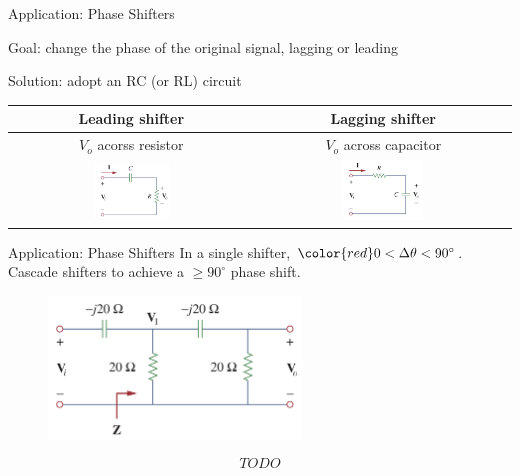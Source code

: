 \documentclass{beamer}
\begin{document}
\begin{frame}{Application: Phase Shifters}

Goal: change the phase of the original signal, lagging or leading

Solution: adopt an RC (or RL) circuit
\begin{table}[]
    \centering
    \begin{tabular}{cc}
        \toprule
        Leading shifter & Lagging shifter \\
        \midrule
        $V_o$ acorss resistor & $V_o$ across capacitor\\
        \includegraphics[width=0.32\textwidth]{img_ch9/3_shifterleadoutput.png}
        &
        \includegraphics[width=0.33\textwidth]{img_ch9/4_shifterlagoutput.png}        
        \\
        \bottomrule
    \end{tabular}
\end{table}
    
\end{frame}

\begin{frame}{Application: Phase Shifters}
In a single shifter, $\color{red} 0 < \Delta\theta < 90^{\circ}$. Cascade shifters to achieve a $\geq 90^{\circ}$ phase shift.

\begin{figure}
    \centering
    \includegraphics[width=0.6\textwidth]{img_ch9/8_cascadedshifter.png}
\end{figure}

$$TODO$$

\end{frame}
\end{document}
